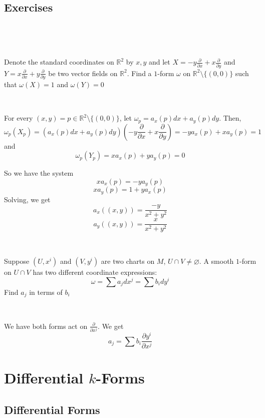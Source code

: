 \documentclass{article}
\begin{document}
\subsection{Exercises}
\

\begin{exercise}[1]
  \

  Denote the standard coordinates on $\mathbb{R}^2$ by $x,y$ and let $X = -y \frac{\partial}{\partial x} + x \frac{\partial }{\partial y}$ and $Y = x\frac{\partial}{\partial x} + y\frac{\partial}{\partial y}$ be two vector fields on $\mathbb{R}^2$. Find a $1$-form $\omega$ on $\mathbb{R}^2 \setminus \{(0,0)\}$ such that $\omega(X) = 1$ and $\omega(Y) = 0$
\end{exercise}

\begin{solution}
  \

  For every $(x,y) = p \in \mathbb{R}^2\setminus \{(0,0)\}$, let $\omega_p = a_x(p)dx + a_y(p)dy$. Then, $$\omega_p(X_p) = (a_x(p)dx + a_y(p)dy)(-y\frac{\partial}{\partial x} + x \frac{\partial}{\partial y}) = -ya_x(p) + xa_y(p) = 1$$and $$\omega_p(Y_p) = xa_x(p) + ya_y(p) = 0$$

  So we have the system $$xa_x(p) = -ya_y(p)$$$$xa_y(p) = 1 + ya_x(p)$$Solving, we get $$a_x((x,y)) = \frac{-y}{x^2+y^2}$$$$a_y((x,y)) = \frac{x}{x^2+y^2}$$
\end{solution}

\begin{exercise}[2]
  \

  Suppose $(U, x^i)$ and $(V, y^i)$ are two charts on $M$, $U \cap V \neq \varnothing$. A smooth $1$-form on $U \cap V$ has two different coordinate expressions: $$\omega = \sum a_j dx^j = \sum b_idy^i$$Find $a_j$ in terms of $b_i$
\end{exercise}

\begin{solution}
  \

  We have both forms act on $\frac{\partial}{\partial x^j}$. We get $$a_j = \sum b_i \frac{\partial y^i}{\partial x^j}$$
\end{solution}

\section{Differential $k$-Forms}

\subsection{Differential Forms}
\
\end{document}
